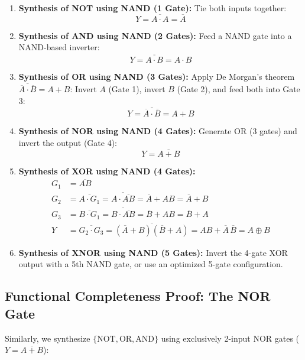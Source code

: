 \begin{enumerate}[label=\bfseries\arabic*.]
    \item \textbf{Synthesis of NOT using NAND (1 Gate):}
    Tie both inputs together:
    \[ Y = \overline{A \cdot A} = \overline{A} \]
    \item \textbf{Synthesis of AND using NAND (2 Gates):}
    Feed a NAND gate into a NAND-based inverter:
    \[ Y = \overline{\overline{A \cdot B}} = A \cdot B \]
    \item \textbf{Synthesis of OR using NAND (3 Gates):}
    Apply De Morgan's theorem $\overline{\overline{A} \cdot \overline{B}} = A + B$:
    Invert $A$ (Gate 1), invert $B$ (Gate 2), and feed both into Gate 3:
    \[ Y = \overline{\overline{A} \cdot \overline{B}} = A + B \]
    \item \textbf{Synthesis of NOR using NAND (4 Gates):}
    Generate OR (3 gates) and invert the output (Gate 4):
    \[ Y = \overline{A + B} \]
    \item \textbf{Synthesis of XOR using NAND (4 Gates):}
    \begin{align*}
    G_1 &= \overline{AB} \\
    G_2 &= \overline{A \cdot G_1} = \overline{A \cdot \overline{AB}} = \overline{A} + AB = \overline{A} + B \\
    G_3 &= \overline{B \cdot G_1} = \overline{B \cdot \overline{AB}} = \overline{B} + AB = \overline{B} + A \\
    Y &= \overline{G_2 \cdot G_3} = \overline{(\overline{A} + B)(\overline{B} + A)} = AB + \overline{A}\,\overline{B} = A \oplus B
    \end{align*}
    \item \textbf{Synthesis of XNOR using NAND (5 Gates):}
    Invert the 4-gate XOR output with a 5th NAND gate, or use an optimized 5-gate configuration.
\end{enumerate}

\subsection{Functional Completeness Proof: The NOR Gate}
Similarly, we synthesize $\{\text{NOT}, \text{OR}, \text{AND}\}$ using exclusively 2-input NOR gates ($Y = \overline{A + B}$):

